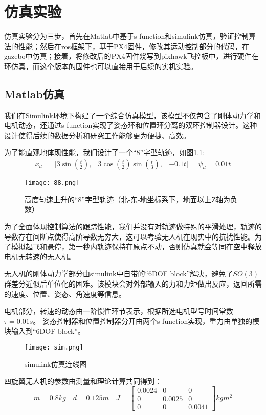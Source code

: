 \chapter{仿真实验}
仿真实验分为三步，首先在Matlab中基于s-function和simulink仿真，验证控制算法的性能；然后在ros框架下，基于PX4固件，修改其运动控制部分的代码，在gazebo中仿真；接着，将修改后的PX4固件烧写到pixhawk飞控板中，进行硬件在环仿真，而这个版本的固件也可以直接用于后续的实机实验。
\section{Matlab仿真}
我们在Simulink环境下构建了一个综合仿真模型，该模型不仅包含了刚体动力学和电机动态，还通过s-function实现了姿态环和位置环分离的双环控制器设计。这种设计使得后续的数据分析和研究工作能够更为便捷、高效。

为了能直观地体现性能，我们设计了一个“8”字型轨迹，如图\ref{fig:8}:
$$x_d = \begin{matrix}[3\sin(\frac{t}{2}), & 3\cos(\frac{t}{2})\sin(\frac{t}{3}), &-0.1t]\end{matrix}
\quad
\psi_d=0.01t$$

\begin{figure}[!h]
  \centering
  \texttt{[image: 88.png]}
  \caption{高度匀速上升的“8”字型轨迹（北-东-地坐标系下，地面以上Z轴为负数）}
  \label{fig:8}
\end{figure}

为了全面体现控制算法的跟踪性能，我们并没有对轨迹做特殊的平滑处理，轨迹的导数存在间断点使得高阶导数无穷大，这可以考验无人机在现实中的抗扰性能。为了模拟起飞和悬停，第一秒内轨迹保持在原点不动，否则仿真就会等同在空中释放电机无转速的无人机。


  无人机的刚体动力学部分由simulink中自带的“6DOF block”解决，避免了$SO(3)$群差分近似后单位化的困难。该模块会对外部输入的力和力矩做出反应，返回所需的速度、位置、姿态、角速度等信息。

  电机部分，转速的动态由一阶惯性环节表示，根据所选电机型号时间常数$\tau=0.01s$。
  姿态控制器和位置控制器分开由两个s-function实现，重力由单独的模块输入到“6DOF block”。
  \begin{figure}[!h]
    \centering
    \texttt{[image: sim.png]}
    \caption{simulink仿真连线图}
    \label{fig:sim}
  \end{figure}

  四旋翼无人机的参数由测量和理论计算共同得到：
  $$m=0.8kg \quad d=0.125m \quad J=\begin{bmatrix}
    0.0024   &      0  &       0\\
    0 &   0.0025      &   0\\
    0  &       0   & 0.0041
  \end{bmatrix}kg m^2$$

